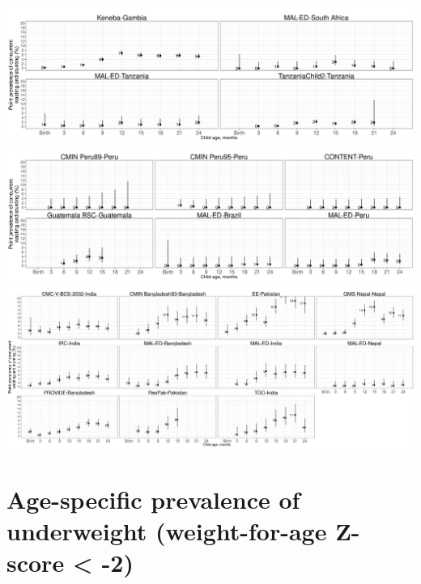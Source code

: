 \documentclass[
  9pt,
]{book}
\begin{document}
\includegraphics[width=62.5in]{figures//wasting/fig-co_plot_africa}
\includegraphics[width=62.5in]{figures//wasting/fig-co_plot_lam}
\includegraphics[width=83.33in]{figures//wasting/fig-co_plot_sasia}

\hypertarget{age-specific-prevalence-of-underweight-weight-for-age-z-score--2}{%
\section{Age-specific prevalence of underweight (weight-for-age Z-score \textless{} -2)}\label{age-specific-prevalence-of-underweight-weight-for-age-z-score--2}}
\end{document}
